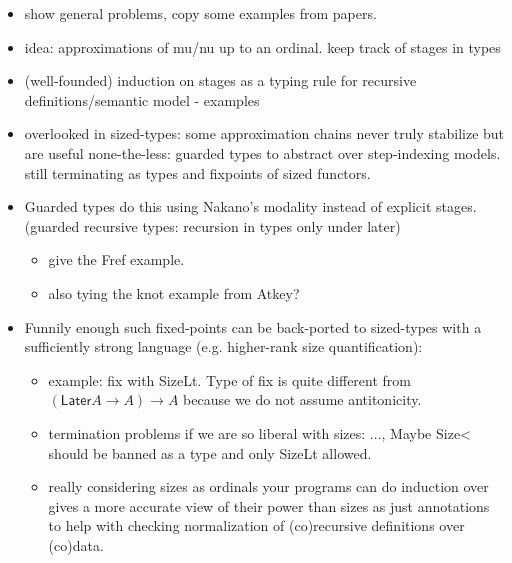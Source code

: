 \documentclass{book}
\begin{document}
  \begin{itemize}
  \item show general problems, copy some examples from papers.
  \item idea: approximations of mu/nu up to an ordinal. keep track of stages in types
  \item (well-founded) induction on stages as a typing rule for recursive definitions/semantic model
    - examples
  \item overlooked in sized-types: some approximation chains never truly
  stabilize but are useful none-the-less: guarded types to abstract
  over step-indexing models. still terminating as types and fixpoints of sized functors.
  \item Guarded types do this using Nakano's modality instead of explicit stages. (guarded recursive types: recursion in types only under later)
    \begin{itemize}
    \item give the Fref example.
    \item also tying the knot example from Atkey?
    \end{itemize}

  \item Funnily enough such fixed-points can be back-ported to
    sized-types with a sufficiently strong language (e.g. higher-rank
    size quantification):
    \begin{itemize}
    \item example: fix with SizeLt. Type of fix is quite different from
    $(\mathsf{Later} A \to  A) \to A$ because we do not assume antitonicity.

    \item termination problems if we are so liberal with sizes: ..., Maybe Size< should be banned as a type and only SizeLt allowed.
    \item really considering sizes as ordinals your programs can do
         induction over gives a more accurate view of their power than sizes as just
         annotations to help with checking normalization of (co)recursive definitions over (co)data.
    \end{itemize}
    \end{itemize}
\end{document}
